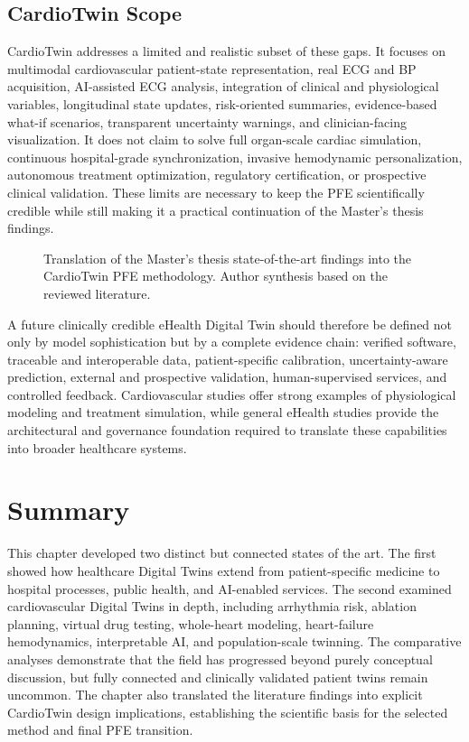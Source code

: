 \subsection{CardioTwin Scope}
CardioTwin addresses a limited and realistic subset of these gaps. It focuses on multimodal cardiovascular patient-state representation, real ECG and BP acquisition, AI-assisted ECG analysis, integration of clinical and physiological variables, longitudinal state updates, risk-oriented summaries, evidence-based what-if scenarios, transparent uncertainty warnings, and clinician-facing visualization. It does not claim to solve full organ-scale cardiac simulation, continuous hospital-grade synchronization, invasive hemodynamic personalization, autonomous treatment optimization, regulatory certification, or prospective clinical validation. These limits are necessary to keep the PFE scientifically credible while still making it a practical continuation of the Master’s thesis findings.

\begin{figure}[H]
    \centering
    \resizebox{0.98\textwidth}{!}{}
    \caption{Translation of the Master's thesis state-of-the-art findings into the CardioTwin PFE methodology. Author synthesis based on the reviewed literature.}
    \label{fig:master_to_cardiotwin}
\end{figure}

A future clinically credible eHealth Digital Twin should therefore be defined not only by model sophistication but by a complete evidence chain: verified software, traceable and interoperable data, patient-specific calibration, uncertainty-aware prediction, external and prospective validation, human-supervised services, and controlled feedback. Cardiovascular studies offer strong examples of physiological modeling and treatment simulation, while general eHealth studies provide the architectural and governance foundation required to translate these capabilities into broader healthcare systems.

\section{Summary}
This chapter developed two distinct but connected states of the art. The first showed how healthcare Digital Twins extend from patient-specific medicine to hospital processes, public health, and AI-enabled services. The second examined cardiovascular Digital Twins in depth, including arrhythmia risk, ablation planning, virtual drug testing, whole-heart modeling, heart-failure hemodynamics, interpretable AI, and population-scale twinning. The comparative analyses demonstrate that the field has progressed beyond purely conceptual discussion, but fully connected and clinically validated patient twins remain uncommon. The chapter also translated the literature findings into explicit CardioTwin design implications, establishing the scientific basis for the selected method and final PFE transition.

\clearpage
